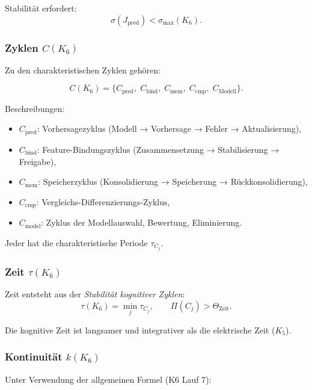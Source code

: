 Stabilität erfordert:
\[
\sigma(J_{\mathrm{pred}}) < \sigma_{\max}(K_6).
\]

\subsubsection{Zyklen \texorpdfstring{$C(K_6)$}{C(K_6)}}

Zu den charakteristischen Zyklen gehören:

\[
C(K_6) =
\{
C_{\mathrm{pred}},\;
C_{\mathrm{bind}},\;
C_{\mathrm{mem}},\;
C_{\mathrm{cmp}},\;
C_{\mathrm{Modell}}
\}.
\]

Beschreibungen:
\begin{itemize}
    \item $C_{\mathrm{pred}}$: Vorhersagezyklus (Modell → Vorhersage → Fehler → Aktualisierung),
    \item $C_{\mathrm{bind}}$: Feature-Bindungszyklus (Zusammensetzung → Stabilisierung → Freigabe),
    \item $C_{\mathrm{mem}}$: Speicherzyklus (Konsolidierung → Speicherung → Rückkonsolidierung),
    \item $C_{\mathrm{cmp}}$: Vergleichs-Differenzierungs-Zyklus,
    \item $C_{\mathrm{model}}$: Zyklus der Modellauswahl, Bewertung, Eliminierung.
\end{itemize}

Jeder hat die charakteristische Periode $\tau_{C_j}$.

\subsubsection{Zeit \texorpdfstring{$\tau(K_6)$}{\tau(K_6)}}

Zeit entsteht aus der \emph{Stabilität kognitiver Zyklen}:
\[
\tau(K_6)
= \min_j \tau_{C_j},
\qquad
\Pi(C_j) > \Theta_{\mathrm{Zeit}}.
\]

Die kognitive Zeit ist langsamer und integrativer als die elektrische Zeit ($K_5$).

\subsubsection{Kontinuität \texorpdfstring{$k(K_6)$}{k(K_6)}}

Unter Verwendung der allgemeinen Formel (K6 Lauf 7):

